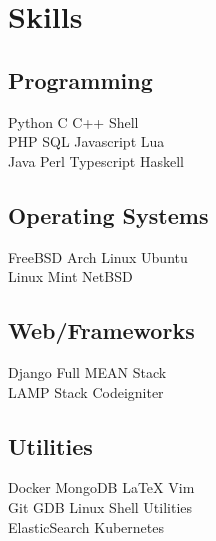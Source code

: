 \documentclass[]{deedy-resume-openfont}
\begin{document}
\begin{minipage}[t]{0.30\textwidth}

\section{Skills}
\subsection{Programming}
Python \textbullet{} C \textbullet{} C++ \textbullet{} Shell \\
 \vspace{0.1 cm}
PHP \textbullet{} SQL \textbullet{} Javascript \textbullet{}  Lua \\
 Java \textbullet{} Perl \textbullet{} Typescript \textbullet{} Haskell \\
\vspace{0.4 cm}
\subsection{Operating Systems}
FreeBSD \textbullet{} Arch Linux \textbullet{} Ubuntu \\
Linux Mint \textbullet{} NetBSD
\vspace{0.4 cm} 
\subsection{Web/Frameworks}
Django \textbullet{} Full MEAN Stack \\
LAMP Stack \textbullet{} Codeigniter \\
\vspace{0.4 cm}
\subsection{Utilities}
Docker \textbullet{} MongoDB \textbullet{} \LaTeX{} \textbullet{} Vim \\
Git \textbullet{} GDB \textbullet{} Linux Shell Utilities \\
ElasticSearch \textbullet{} Kubernetes \\


\vspace{0.2cm}

\end{minipage}
\end{document}
